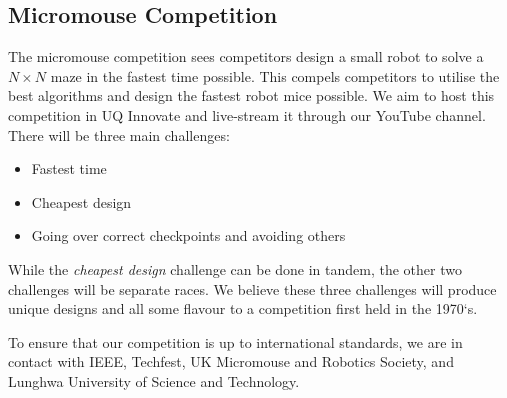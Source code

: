 \documentclass[a4paper,12pt]{report}
\begin{document}
\subsection*{Micromouse Competition}
The micromouse competition sees competitors design a small robot to solve a $N\times N$ maze in the fastest time possible.
This compels competitors to utilise the best algorithms and design the fastest robot mice possible. We aim to host this competition in UQ Innovate and live-stream it through our YouTube channel.
There will be three main challenges:
\begin{itemize}
    \item Fastest time
    \item Cheapest design
    \item Going over correct checkpoints and avoiding others
\end{itemize}
While the \textit{cheapest design} challenge can be done in tandem, the other two challenges will be separate races. We believe these three challenges will produce unique designs and all some flavour to a competition first held in the 1970`s.

To ensure that our competition is up to international standards, we are in contact with IEEE, Techfest, UK Micromouse and Robotics Society, and Lunghwa University of Science and Technology. 

\newpage
\end{document}
